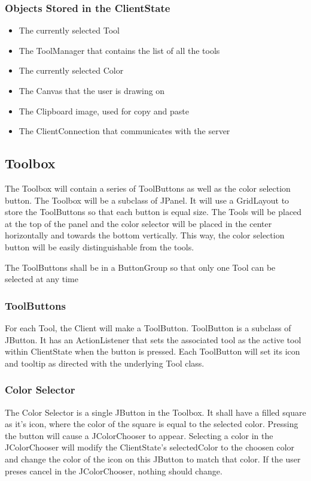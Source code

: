\documentclass[11pt,oneside,a4paper]{article}
\begin{document}
  \subsubsection{Objects Stored in the ClientState}
  \begin{itemize}
  \item
  The currently selected Tool
  \item 
  The ToolManager that contains the list of all the tools
  \item 
  The currently selected Color
  \item
  The Canvas that the user is drawing on
  \item
  The Clipboard image, used for copy and paste
  \item
  The ClientConnection that communicates with the server
  \end{itemize}

 \subsection{Toolbox}
  The Toolbox will contain a series of ToolButtons as well as the color
  selection button. The Toolbox will be a subclass of JPanel. It will use a
  GridLayout to store the ToolButtons so that each button is equal size. The
  Tools will be placed at the top of the panel and the color selector will be
  placed in the center horizontally and towards the bottom vertically. This
  way, the color selection button will be easily distinguishable from the
  tools. 
  
  The ToolButtons shall be in a ButtonGroup so that only one Tool can be
  selected at any time 

  \subsubsection{ToolButtons}
   For each Tool, the Client will make a ToolButton. ToolButton is a subclass
   of JButton.  It has an ActionListener that sets the associated tool as the
   active tool within ClientState when the button is pressed. Each ToolButton will
   set its icon and tooltip as directed with the underlying Tool class.
 \subsubsection{Color Selector}
 The Color Selector is a single JButton in the Toolbox. It shall have a filled
 square as it's icon, where the color of the square is equal to the selected
 color. Pressing the button will cause a JColorChooser to appear. Selecting a
 color in the JColorChooser will modify the ClientState's selectedColor to the
 choosen color and change the color of the icon on this JButton to match that
 color. If the user preses cancel in the JColorChooser, nothing should change.
\end{document}
